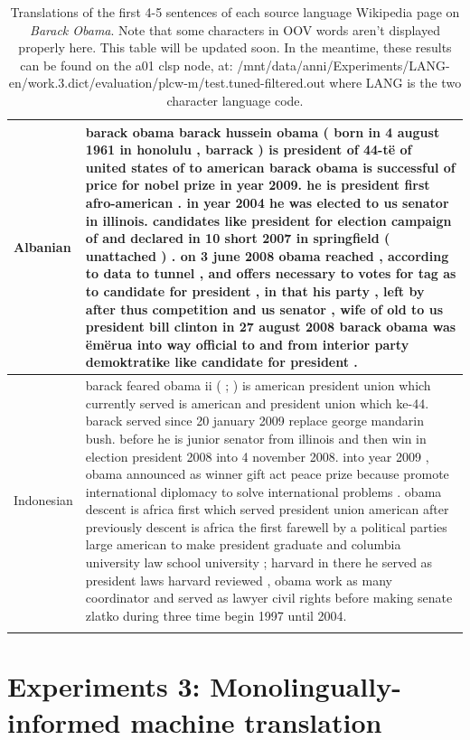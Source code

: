 \documentclass[11pt]{article}
\begin{document}
\begin{center}
\begin{longtable}{|p{1.5cm}|p{13cm}|}
\hline
Albanian & {barack obama barack hussein obama ( born in 4 august 1961 in honolulu , barrack ) is president of 44-të of united states of to american barack obama is successful of price for nobel prize in year 2009. he is president first afro-american . in year 2004 he was elected to us senator in illinois. candidates like president for election campaign of and declared in 10 short 2007 in springfield ( unattached ) . on 3 june 2008 obama reached , according to data to tunnel , and offers necessary to votes for tag as to candidate for president , in that his party , left by after thus competition and us senator , wife of old to us president bill clinton in 27 august 2008 barack obama was ëmërua into way official to and from interior party demoktratike like candidate for president .} \\
\hline
Indonesian & {barack feared obama ii ( ; ) is american president union which currently served is american and president union which ke-44. barack served since 20 january 2009 replace george mandarin bush. before he is junior senator from illinois and then win in election president 2008 into 4 november 2008. into year 2009 , obama announced as winner gift act peace prize because promote international diplomacy to solve international problems . obama descent is africa first which served president union american after previously descent is africa the first farewell by a political parties large american to make president graduate and columbia university law school university ; harvard in there he served as president laws harvard reviewed , obama work as many coordinator and served as lawyer civil rights before making senate zlatko during three time begin 1997 until 2004.} \\
\hline
\caption{Translations of the first 4-5 sentences of each source language Wikipedia page on {\it Barack Obama}. Note that some characters in OOV words aren't displayed properly here. This table will be updated soon. In the meantime, these results can be found on the a01 clsp node, at: /mnt/data/anni/Experiments/LANG-en/work.3.dict/evaluation/plcw-m/test.tuned-filtered.out where LANG is the two character language code.} \label{table:qualtrans}  \\
\end{longtable}
\end{center}

\twocolumn

\section{Experiments 3: Monolingually-informed machine translation}
\end{document}
